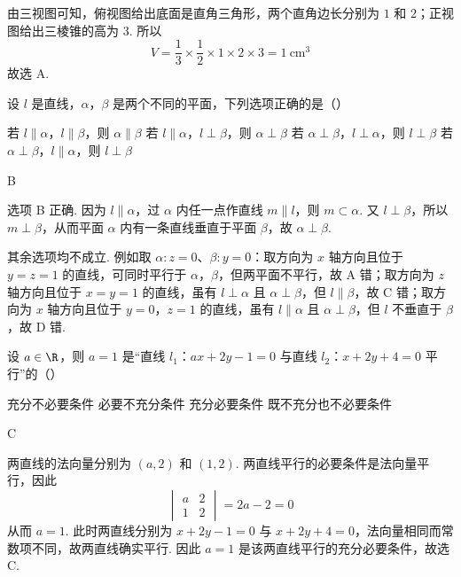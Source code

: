 \begin{solution}
由三视图可知，俯视图给出底面是直角三角形，两个直角边长分别为 \(1\) 和 \(2\)；正视图给出三棱锥的高为 \(3\). 所以
\[
V=\frac{1}{3}\times\frac{1}{2}\times1\times2\times3=1\ \mathrm{cm}^{3}
\]
故选 A.
\end{solution}

\begin{problem}
设 \(l\) 是直线，\(\alpha\)，\(\beta\) 是两个不同的平面，下列选项正确的是（\quad）

\choices
    {若 \(l \parallel \alpha\)，\(l \parallel \beta\)，则 \(\alpha \parallel \beta\)}
    {若 \(l \parallel \alpha\)，\(l \perp \beta\)，则 \(\alpha \perp \beta\)}
    {若 \(\alpha \perp \beta\)，\(l \perp \alpha\)，则 \(l \perp \beta\)}
    {若 \(\alpha \perp \beta\)，\(l \parallel \alpha\)，则 \(l \perp \beta\)}
\end{problem}

\begin{answer}
B
\end{answer}

\begin{solution}
选项 B 正确. 因为 \(l\parallel\alpha\)，过 \(\alpha\) 内任一点作直线 \(m\parallel l\)，则 \(m\subset\alpha\). 又 \(l\perp\beta\)，所以 \(m\perp\beta\)，从而平面 \(\alpha\) 内有一条直线垂直于平面 \(\beta\)，故 \(\alpha\perp\beta\).

其余选项均不成立. 例如取 \(\alpha:z=0\)、\(\beta:y=0\)：取方向为 \(x\) 轴方向且位于 \(y=z=1\) 的直线，可同时平行于 \(\alpha\)，\(\beta\)，但两平面不平行，故 A 错；取方向为 \(z\) 轴方向且位于 \(x=y=1\) 的直线，虽有 \(l\perp\alpha\) 且 \(\alpha\perp\beta\)，但 \(l\parallel\beta\)，故 C 错；取方向为 \(x\) 轴方向且位于 \(y=0\)，\(z=1\) 的直线，虽有 \(l\parallel\alpha\) 且 \(\alpha\perp\beta\)，但 \(l\) 不垂直于 \(\beta\)，故 D 错.
\end{solution}

\begin{problem}
设 \(a \in \R\)，则 \(a = 1\) 是“直线 \(l_1\)：\(ax + 2y - 1 = 0\) 与直线 \(l_2\)：\(x + 2y + 4 = 0\) 平行”的（\quad）

\choices
    {充分不必要条件}
    {必要不充分条件}
    {充分必要条件}
    {既不充分也不必要条件}
\end{problem}

\begin{answer}
C
\end{answer}

\begin{solution}
两直线的法向量分别为 \((a,2)\) 和 \((1,2)\). 两直线平行的必要条件是法向量平行，因此
\[
\begin{vmatrix}a&2\\1&2\end{vmatrix}=2a-2=0
\]
从而 \(a=1\). 此时两直线分别为 \(x+2y-1=0\) 与 \(x+2y+4=0\)，法向量相同而常数项不同，故两直线确实平行. 因此 \(a=1\) 是该两直线平行的充分必要条件，故选 C.
\end{solution}

